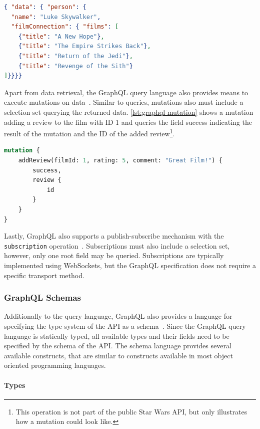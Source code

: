 \begin{lstlisting}[language=json, caption={SWAPI GraphQL Response}, label={lst:graphql-response}]
{ "data": { "person": {
  "name": "Luke Skywalker",
  "filmConnection": { "films": [
    {"title": "A New Hope"},
    {"title": "The Empire Strikes Back"},
    {"title": "Return of the Jedi"},
    {"title": "Revenge of the Sith"}
]}}}}
\end{lstlisting}

Apart from data retrieval, the GraphQL query language also provides means to execute mutations on data~\cite{Facebook2018}.
Similar to queries, mutations also must include a selection set querying the returned data.
\autoref{lst:graphql-mutation} shows a mutation adding a review to the film with ID 1 and queries the field success indicating the result of the mutation and the ID of the added review\footnote{This operation is not part of the public Star Wars \ac{API}, but only illustrates how a mutation could look like.}.

\begin{lstlisting}[language=graphql, caption={GraphQL Mutations}, label={lst:graphql-mutation}]
mutation {
    addReview(filmId: 1, rating: 5, comment: "Great Film!") {
        success,
        review {
            id
        }
    }
}    
\end{lstlisting}

Lastly, GraphQL also supports a publish-subscribe mechanism with the \texttt{subscription} operation~\cite{Facebook2018}.
Subscriptions must also include a selection set, however, only one root field may be queried.
Subscriptions are typically implemented using WebSockets, but the GraphQL specification does not require a specific transport method.

\subsubsection{GraphQL Schemas}

Additionally to the query language, GraphQL also provides a language for specifying the type system of the \ac{API} as a schema~\cite{Diaz2020}.
Since the GraphQL query language is statically typed, all available types and their fields need to be specified by the schema of the \ac{API}.
The schema language provides several available constructs, that are similar to constructs available in most object oriented programming languages.

\paragraph{Types}

